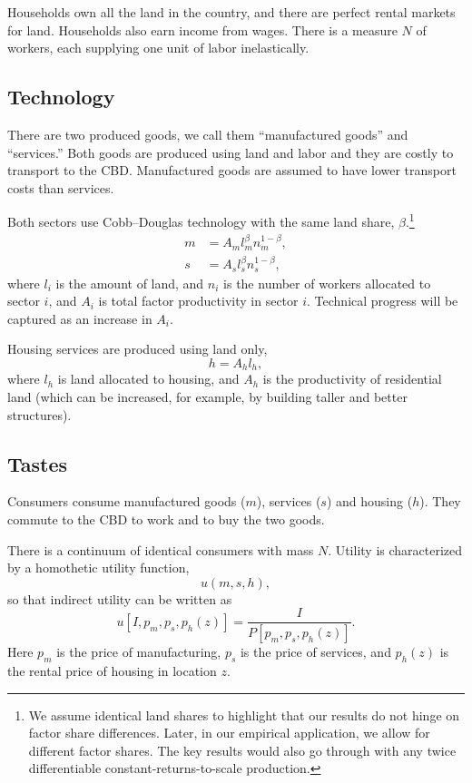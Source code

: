 \documentclass[12pt]{article}
\begin{document}
Households own all the land in the country, and there are perfect rental markets for land. Households also earn income from wages. There is a measure $N$ of workers, each supplying one unit of labor inelastically.

\subsection{Technology}
There are two produced goods, we call them ``manufactured goods'' and ``services.'' Both goods are produced using land and labor and they are costly to transport to the CBD. Manufactured goods are assumed to have lower transport costs than services.

Both sectors use Cobb--Douglas technology with the same land share, $\beta$.\footnote{We assume identical land shares to highlight that our results do not hinge on factor share differences. Later, in our empirical application, we allow for different factor shares. The key results would also go through with any twice differentiable constant-returns-to-scale production.}
\begin{align*}
m&=A_ml_m^\beta n_m^{1-\beta},\\
s&=A_sl_s^\beta n_s^{1-\beta},
\end{align*}
where $l_i$ is the amount of land, and $n_i$ is the number of workers allocated to sector $i$, and $A_i$ is total factor productivity in sector $i$. Technical progress will be captured as an increase in $A_i$.

Housing services are produced using land only,
\[
 h=A_hl_h,
\]
where $l_h$ is land allocated to housing, and $A_h$ is the productivity of residential land (which can be increased, for example, by building taller and better structures).

\subsection{Tastes}
Consumers consume manufactured goods ($m$), services ($s$) and housing ($h$). They commute to the CBD to work and to buy the two goods.

There is a continuum of identical consumers with mass $N$. Utility is characterized by a homothetic utility function,
\[
u(m,s,h),
\]
so that indirect utility can be written as
\[
u[I, p_m,p_s,p_h(z)] = \frac{I}{P[p_m,p_s,p_h(z)]}.
\]
Here $p_m$ is the price of manufacturing, $p_s$ is the price of services, and $p_h(z)$ is the rental price of housing in location $z$.
\end{document}
